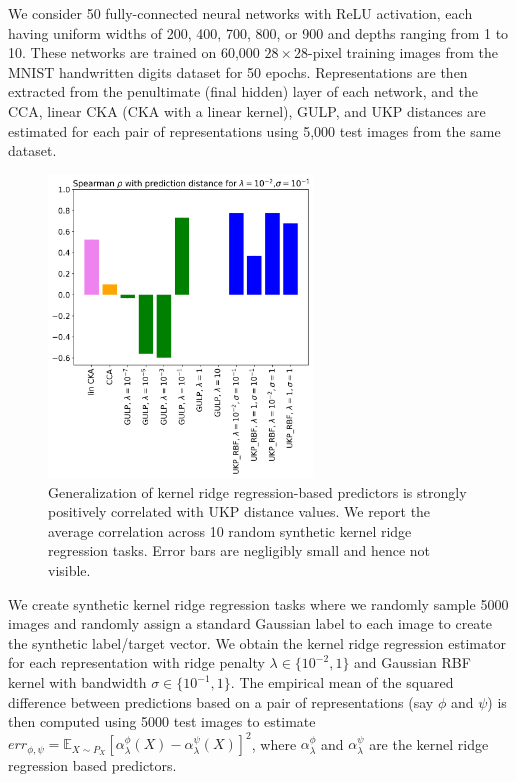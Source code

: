 \documentclass{article}
\theoremstyle{plain}
\newcommand{\E}{\mathbb{E}}
\newcommand{\repone}{\phi}
\newcommand{\reptwo}{\psi}
\newcommand{\metricstname}{UKP }
\begin{document}
We consider 50 fully-connected neural networks with ReLU activation, each having uniform widths of 200, 400, 700, 800, or 900 and depths ranging from 1 to 10. These networks are trained on 60,000 $28 \times 28$-pixel training images from the MNIST handwritten digits dataset \cite{deng2012mnist} for 50 epochs. Representations are then extracted from the penultimate (final hidden) layer of each network, and the CCA, linear CKA (CKA with a linear kernel), GULP, and UKP distances are estimated for each pair of representations using 5,000 test images from the same dataset.

\begin{figure}[h]
\includegraphics[width=7cm]{Figures/krrgen_mnist/generalization_lambda0.01_sigma0.1.png}
\vspace{.1in}
\caption{Generalization of kernel ridge regression-based predictors is strongly positively correlated with \metricstname distance values. We report the average correlation across 10 random synthetic kernel ridge regression tasks. Error bars are negligibly small and hence not visible.}
\label{Generalization plot}
\end{figure}

We create synthetic kernel ridge regression tasks where we randomly sample 5000 images and randomly assign a standard Gaussian label to each image to create the synthetic label/target vector. We obtain the kernel ridge regression estimator for each representation with ridge penalty $\lambda \in \{10^{-2},1\}$ and Gaussian RBF kernel with bandwidth $\sigma \in \{10^{-1}, 1\}$. The empirical mean of the squared difference between predictions based on a pair of representations (say $\repone$ and $\reptwo$) is then computed using 5000 test images to estimate $err_{\repone,\reptwo} = \E_{X \sim P_{X}}\left[\alpha_{\lambda}^{\repone}(X)-\alpha_{\lambda}^{\reptwo}(X)\right]^{2}$, where $\alpha_{\lambda}^{\repone}$ and $\alpha_{\lambda}^{\reptwo}$ are the kernel ridge regression based predictors. 
\end{document}
